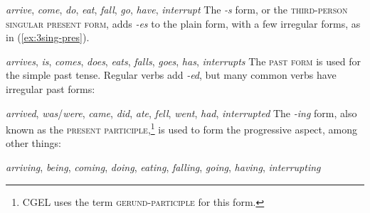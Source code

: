 \ea \textit{arrive}, \textit{come}, \textit{do}, \textit{eat}, \textit{fall}, \textit{go}, \textit{have}, \textit{interrupt}
\z
The \textit{-s} form, or the \textsc{third-person singular present form}, adds \textit{-{\op}e{\cp}s} to the plain form, with a few irregular forms, as in (\ref{ex:3sing-pres}).

\ea \textit{arrives}, \textit{is}, \textit{comes}, \textit{does}, \textit{eats}, \textit{falls}, \textit{goes}, \textit{has}, \textit{interrupts}\label{ex:3sing-pres}
\z
The \textsc{past form} is used for the simple past tense. Regular verbs add \textit{-ed}, but many common verbs have irregular past forms:

\ea \textit{arrived}, \textit{was}/\textit{were}, \textit{came}, \textit{did}, \textit{ate}, \textit{fell}, \textit{went}, \textit{had}, \textit{interrupted}\label{ex:past-tense-forms}
\z
The \textit{-ing} form, also known as the \textsc{present participle}\label{sec:participles},\footnote{CGEL uses the term \textsc{gerund-participle} for this form.} is used to form the progressive aspect, among other things:

\ea \textit{arriving}, \textit{being}, \textit{coming}, \textit{doing}, \textit{eating}, \textit{falling}, \textit{going}, \textit{having}, \textit{interrupting}\label{ex:-ing}
\z

